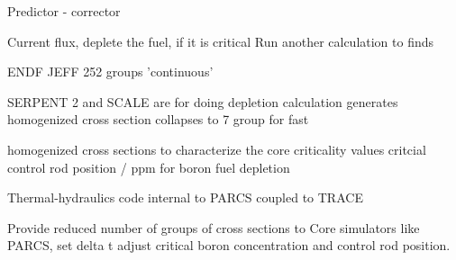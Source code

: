 \documentclass[9pt]{beamer}
\begin{document}
Predictor - corrector

Current flux, deplete the fuel, if it is critical
Run another calculation to finds

ENDF JEFF 252 groups 'continuous'


SERPENT 2 and SCALE are for doing depletion calculation
generates homogenized cross section
collapses to 7 group for fast


homogenized cross sections to characterize the core
  criticality values
  critcial control rod position / ppm for boron
  fuel depletion

Thermal-hydraulics code
internal to PARCS
coupled to TRACE

Provide reduced number of groups of cross sections to
Core simulators like PARCS, set delta t
adjust critical boron concentration and control rod position.
\end{document}
